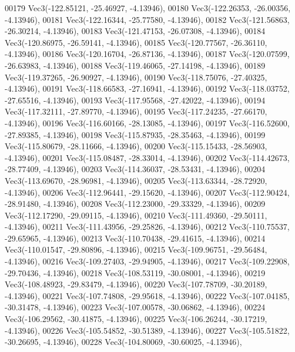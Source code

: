 \begin{DoxyCode}
00179         Vec3(-122.85121, -25.46927, -4.13946),
00180         Vec3(-122.26353, -26.00356, -4.13946),
00181         Vec3(-122.16344, -25.77580, -4.13946),
00182         Vec3(-121.56863, -26.30214, -4.13946),
00183         Vec3(-121.47153, -26.07308, -4.13946),
00184         Vec3(-120.86975, -26.59141, -4.13946),
00185         Vec3(-120.77567, -26.36110, -4.13946),
00186         Vec3(-120.16704, -26.87136, -4.13946),
00187         Vec3(-120.07599, -26.63983, -4.13946),
00188         Vec3(-119.46065, -27.14198, -4.13946),
00189         Vec3(-119.37265, -26.90927, -4.13946),
00190         Vec3(-118.75076, -27.40325, -4.13946),
00191         Vec3(-118.66583, -27.16941, -4.13946),
00192         Vec3(-118.03752, -27.65516, -4.13946),
00193         Vec3(-117.95568, -27.42022, -4.13946),
00194         Vec3(-117.32111, -27.89770, -4.13946),
00195         Vec3(-117.24235, -27.66170, -4.13946),
00196         Vec3(-116.60166, -28.13085, -4.13946),
00197         Vec3(-116.52600, -27.89385, -4.13946),
00198         Vec3(-115.87935, -28.35463, -4.13946),
00199         Vec3(-115.80679, -28.11666, -4.13946),
00200         Vec3(-115.15433, -28.56903, -4.13946),
00201         Vec3(-115.08487, -28.33014, -4.13946),
00202         Vec3(-114.42673, -28.77409, -4.13946),
00203         Vec3(-114.36037, -28.53431, -4.13946),
00204         Vec3(-113.69670, -28.96981, -4.13946),
00205         Vec3(-113.63344, -28.72920, -4.13946),
00206         Vec3(-112.96441, -29.15620, -4.13946),
00207         Vec3(-112.90424, -28.91480, -4.13946),
00208         Vec3(-112.23000, -29.33329, -4.13946),
00209         Vec3(-112.17290, -29.09115, -4.13946),
00210         Vec3(-111.49360, -29.50111, -4.13946),
00211         Vec3(-111.43956, -29.25826, -4.13946),
00212         Vec3(-110.75537, -29.65965, -4.13946),
00213         Vec3(-110.70438, -29.41615, -4.13946),
00214         Vec3(-110.01547, -29.80896, -4.13946),
00215         Vec3(-109.96751, -29.56484, -4.13946),
00216         Vec3(-109.27403, -29.94905, -4.13946),
00217         Vec3(-109.22908, -29.70436, -4.13946),
00218         Vec3(-108.53119, -30.08001, -4.13946),
00219         Vec3(-108.48923, -29.83479, -4.13946),
00220         Vec3(-107.78709, -30.20189, -4.13946),
00221         Vec3(-107.74808, -29.95618, -4.13946),
00222         Vec3(-107.04185, -30.31478, -4.13946),
00223         Vec3(-107.00578, -30.06862, -4.13946),
00224         Vec3(-106.29562, -30.41875, -4.13946),
00225         Vec3(-106.26244, -30.17219, -4.13946),
00226         Vec3(-105.54852, -30.51389, -4.13946),
00227         Vec3(-105.51822, -30.26695, -4.13946),
00228         Vec3(-104.80069, -30.60025, -4.13946),

\end{DoxyCode}
